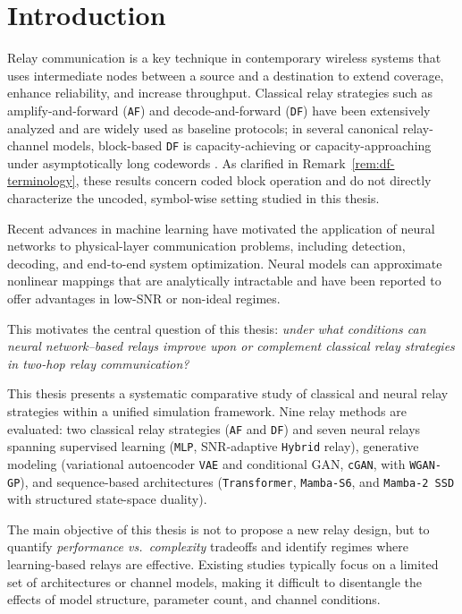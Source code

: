 \chapter{Introduction}\label{sec:introduction}

Relay communication is a key technique in contemporary wireless systems that uses intermediate nodes between a source and a destination to extend coverage, enhance reliability, and increase throughput. Classical relay strategies such as amplify-and-forward (\texttt{AF}) and decode-and-forward (\texttt{DF}) have been extensively analyzed and are widely used as baseline protocols; in several canonical relay-channel models, block-based \texttt{DF} is capacity-achieving or capacity-approaching under asymptotically long codewords \cite{CoverGamal1979RelayChannel,ElGamalKim2011NetworkIT,Laneman2004CooperativeDiversity,RankovWittneben2007HalfDuplexRelay,Nosratinia2004CooperativeCommunication}. As clarified in Remark~\ref{rem:df-terminology}, these results concern coded block operation and do not directly characterize the uncoded, symbol-wise setting studied in this thesis.

Recent advances in machine learning have motivated the application of neural networks to physical-layer communication problems, including detection, decoding, and end-to-end system optimization. Neural models can approximate nonlinear mappings that are analytically intractable and have been reported to offer advantages in low-SNR or non-ideal regimes.

This motivates the central question of this thesis: \emph{under what conditions can neural network--based relays improve upon or complement classical relay strategies in two-hop relay communication?}

This thesis presents a systematic comparative study of classical and neural relay strategies within a unified simulation framework. Nine relay methods are evaluated: two classical relay strategies (\texttt{AF} and \texttt{DF}) and seven neural relays spanning supervised learning (\texttt{MLP}, SNR-adaptive \texttt{Hybrid} relay), generative modeling (variational autoencoder \texttt{VAE} and conditional GAN, \texttt{cGAN}, with \texttt{WGAN-GP}), and sequence-based architectures (\texttt{Transformer}, \texttt{Mamba-S6}, and \texttt{Mamba-2 SSD} with structured state-space duality).

The main objective of this thesis is not to propose a new relay design, but to quantify \textit{performance vs.\ complexity} tradeoffs and identify regimes where learning-based relays are effective. Existing studies typically focus on a limited set of architectures or channel models, making it difficult to disentangle the effects of model structure, parameter count, and channel conditions.

